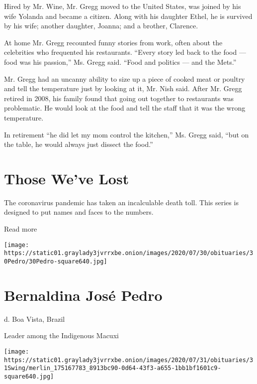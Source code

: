 Hired by Mr. Wine, Mr. Gregg moved to the United States, was joined by
his wife Yolanda and became a citizen. Along with his daughter Ethel, he
is survived by his wife; another daughter, Joanna; and a brother,
Clarence.

At home Mr. Gregg recounted funny stories from work, often about the
celebrities who frequented his restaurants. ``Every story led back to
the food --- food was his passion,'' Ms. Gregg said. ``Food and politics
--- and the Mets.''

Mr. Gregg had an uncanny ability to size up a piece of cooked meat or
poultry and tell the temperature just by looking at it, Mr. Nish said.
After Mr. Gregg retired in 2008, his family found that going out
together to restaurants was problematic. He would look at the food and
tell the staff that it was the wrong temperature.

In retirement ``he did let my mom control the kitchen,'' Ms. Gregg said,
``but on the table, he would always just dissect the food.''

\href{https://www.nytimes3xbfgragh.onion/interactive/2020/obituaries/people-died-coronavirus-obituaries.html?action=click\&pgtype=Article\&state=default\&region=BELOW_MAIN_CONTENT\&context=covid_obits_promo}{}

\hypertarget{those-weve-lost}{%
\section{Those We've Lost}\label{those-weve-lost}}

The coronavirus pandemic has taken an incalculable death toll. This
series is designed to put names and faces to the numbers.

Read more

\texttt{[image: https://static01.graylady3jvrrxbe.onion/images/2020/07/30/obituaries/30Pedro/30Pedro-square640.jpg]}

\hypertarget{bernaldina-josuxe9-pedro}{%
\section{Bernaldina José Pedro}\label{bernaldina-josuxe9-pedro}}

d. Boa Vista, Brazil

Leader among the Indigenous Macuxi

\texttt{[image: https://static01.graylady3jvrrxbe.onion/images/2020/07/31/obituaries/31Swing/merlin\_175167783\_8913bc90-0d64-43f3-a655-1bb1bf1601c9-square640.jpg]}

